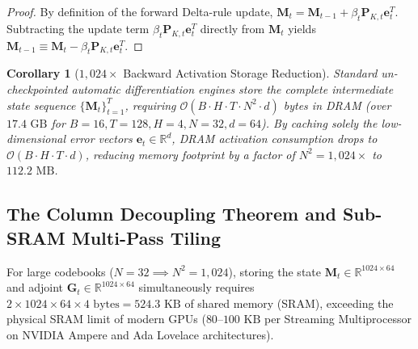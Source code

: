 \documentclass[11pt,a4paper]{article}
\newtheorem{corollary}{Corollary}[theorem]
\begin{document}
\begin{proof}
By definition of the forward Delta-rule update, $\mathbf{M}_t = \mathbf{M}_{t-1} + \beta_t \mathbf{P}_{K,t} \mathbf{e}_t^T$. Subtracting the update term $\beta_t \mathbf{P}_{K,t} \mathbf{e}_t^T$ directly from $\mathbf{M}_t$ yields $\mathbf{M}_{t-1} \equiv \mathbf{M}_t - \beta_t \mathbf{P}_{K,t} \mathbf{e}_t^T$.
\end{proof}

\begin{corollary}[$1,024\times$ Backward Activation Storage Reduction]
Standard un-checkpointed automatic differentiation engines store the complete intermediate state sequence $\{\mathbf{M}_t\}_{t=1}^T$, requiring $\mathcal{O}(B \cdot H \cdot T \cdot N^2 \cdot d)$ bytes in DRAM (over $17.4\text{ GB}$ for $B=16, T=128, H=4, N=32, d=64$). By caching solely the low-dimensional error vectors $\mathbf{e}_t \in \mathbb{R}^d$, DRAM activation consumption drops to $\mathcal{O}(B \cdot H \cdot T \cdot d)$, reducing memory footprint by a factor of $N^2 = 1,024\times$ to $112.2\text{ MB}$.
\end{corollary}

\subsection{The Column Decoupling Theorem and Sub-SRAM Multi-Pass Tiling}
For large codebooks ($N=32 \implies N^2 = 1,024$), storing the state $\mathbf{M}_t \in \mathbb{R}^{1024 \times 64}$ and adjoint $\mathbf{G}_t \in \mathbb{R}^{1024 \times 64}$ simultaneously requires $2 \times 1024 \times 64 \times 4\text{ bytes} = 524.3\text{ KB}$ of shared memory (SRAM), exceeding the physical SRAM limit of modern GPUs ($80$--$100\text{ KB}$ per Streaming Multiprocessor on NVIDIA Ampere and Ada Lovelace architectures).
\end{document}

